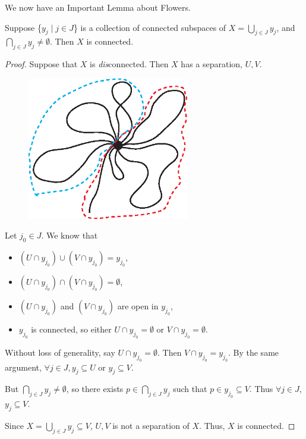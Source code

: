 We now have an Important Lemma about Flowers. 
\begin{lemma}
	Suppose \{$y_j \mid j \in J$\} is a collection of connected subspaces of $X = \displaystyle{\bigcup_{j \in J} y_j}$, and $\displaystyle{\bigcap_{j \in J} y_j} \neq \emptyset$. Then $X$ is connected. 
\end{lemma}
\begin{proof}
	Suppose that $X$ is \textit{dis}connected. Then $X$ has a separation, $U, V$. 
	\begin{figure}
		[ht!] 
		\begin{center}
			\includegraphics[width=200pt]{images/connectedness/flower} 
		\end{center}
	\end{figure}
	
	Let $j_0 \in J$. We know that 
	\begin{itemize}
		\item $(U\cap y_{j_0}) \cup (V\cap y_{j_0}) = y_{j_0}$, 
		\item $(U\cap y_{j_0}) \cap (V\cap y_{j_0}) = \emptyset$, 
		\item $(U\cap y_{j_0})$ and $(V\cap y_{j_0})$ are open in $y_{j_0}$, 
		\item $y_{j_0}$ is connected, so either $U \cap y_{j_0} = \emptyset$ or $V \cap y_{j_0} = \emptyset$. 
	\end{itemize}
	Without loss of generality, say $U \cap y_{j_0} = \emptyset$. Then $V \cap y_{j_0} = y_{j_0}$. By the same argument, $\forall j\in J, y_j \subseteq U$ or $y_j \subseteq V$.
	
	But $\displaystyle{\bigcap_{j \in J} y_j} \neq \emptyset$, so there exists $p\in \displaystyle{\bigcap_{j \in J} y_j}$ such that $p\in y_{j_0} \subseteq V$. Thus $\forall j\in J$, $y_j \subseteq V$.
	
	Since $X = \displaystyle{\bigcup_{j \in J} y_j} \subseteq V$, $U, V$ is not a separation of $X$. Thus, $X$ is connected. 
\end{proof}
